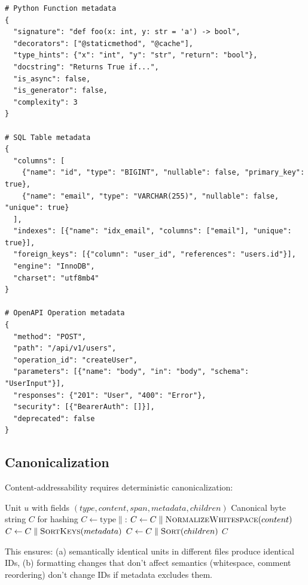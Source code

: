 \begin{verbatim}
# Python Function metadata
{
  "signature": "def foo(x: int, y: str = 'a') -> bool",
  "decorators": ["@staticmethod", "@cache"],
  "type_hints": {"x": "int", "y": "str", "return": "bool"},
  "docstring": "Returns True if...",
  "is_async": false,
  "is_generator": false,
  "complexity": 3
}

# SQL Table metadata
{
  "columns": [
    {"name": "id", "type": "BIGINT", "nullable": false, "primary_key": true},
    {"name": "email", "type": "VARCHAR(255)", "nullable": false, "unique": true}
  ],
  "indexes": [{"name": "idx_email", "columns": ["email"], "unique": true}],
  "foreign_keys": [{"column": "user_id", "references": "users.id"}],
  "engine": "InnoDB",
  "charset": "utf8mb4"
}

# OpenAPI Operation metadata
{
  "method": "POST",
  "path": "/api/v1/users",
  "operation_id": "createUser",
  "parameters": [{"name": "body", "in": "body", "schema": "UserInput"}],
  "responses": {"201": "User", "400": "Error"},
  "security": [{"BearerAuth": []}],
  "deprecated": false
}
\end{verbatim}

\subsection{Canonicalization}
\label{sec:parsing:canonicalize}

Content-addressability requires deterministic canonicalization:

\begin{algorithm}[H]
\caption{Unit Canonicalization}
\label{alg:canonicalize}
\begin{algorithmic}[1]
\Require Unit $u$ with fields $(type, content, span, metadata, children)$
\Ensure Canonical byte string $C$ for hashing
\State $C \gets \text{type} \parallel \texttt{:}$ 
\State $C \gets C \parallel \textsc{NormalizeWhitespace}(content)$ 
\State $C \gets C \parallel \textsc{SortKeys}(metadata)$ 
\State $C \gets C \parallel \textsc{Sort}(children)$ 
\State \Return $C$
\end{algorithmic}
\end{algorithm}

This ensures: (a) semantically identical units in different files produce identical IDs, (b) formatting changes that don't affect semantics (whitespace, comment reordering) don't change IDs if metadata excludes them.

